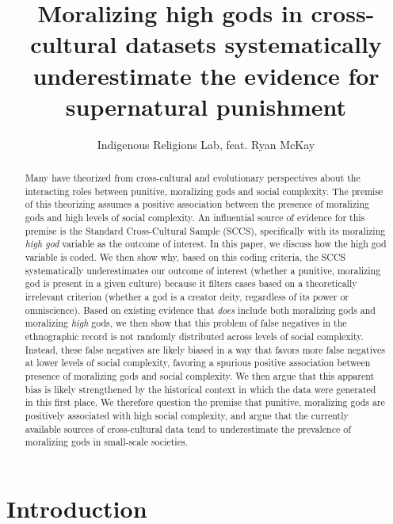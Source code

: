\documentclass[
]{article}
\title{\textbf{Moralizing high gods in cross-cultural datasets systematically underestimate the evidence for supernatural punishment}}
\author{Indigenous Religions Lab, feat. Ryan McKay}
\date{}
\begin{document}
\maketitle
\begin{abstract}
Many have theorized from cross-cultural and evolutionary perspectives about the interacting roles between punitive, moralizing gods and social complexity. The premise of this theorizing assumes a positive association between the presence of moralizing gods and high levels of social complexity. An influential source of evidence for this premise is the Standard Cross-Cultural Sample (SCCS), specifically with its moralizing \emph{high god} variable as the outcome of interest. In this paper, we discuss how the high god variable is coded. We then show why, based on this coding criteria, the SCCS systematically underestimates our outcome of interest (whether a punitive, moralizing god is present in a given culture) because it filters cases based on a theoretically irrelevant criterion (whether a god is a creator deity, regardless of its power or omniscience). Based on existing evidence that \emph{does} include both moralizing gods and moralizing \emph{high} gods, we then show that this problem of false negatives in the ethnographic record is not randomly distributed across levels of social complexity. Instead, these false negatives are likely biased in a way that favors more false negatives at lower levels of social complexity, favoring a spurious positive association between presence of moralizing gods and social complexity. We then argue that this apparent bias is likely strengthened by the historical context in which the data were generated in this first place. We therefore question the premise that punitive, moralizing gods are positively associated with high social complexity, and argue that the currently available sources of cross-cultural data tend to underestimate the prevalence of moralizing gods in small-scale societies.
\end{abstract}

\section{Introduction}
\end{document}
